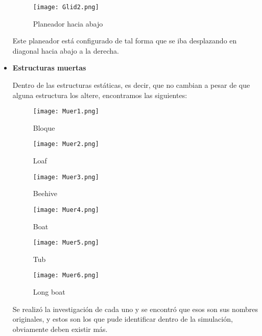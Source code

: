 \documentclass{article}
\begin{document}
\begin{itemize}
		\vspace{300pt}
		\begin{figure}[htbp]
		\centering       
		\texttt{[image: Glid2.png]}
		\caption{Planeador hacia abajo}
		\label{fig:G2} 
	\end{figure}
	
	Este planeador está configurado de tal forma que se iba desplazando en diagonal hacia abajo a la derecha. 
	
		\item \textbf{Estructuras muertas}
	
	Dentro de las estructuras estáticas, es decir, que no cambian a pesar de que alguna estructura los altere, encontramos las siguientes:
	\vspace{600pt}
	
	\begin{figure}[htbp]
		\centering       
		\texttt{[image: Muer1.png]}
		\caption{Bloque}
		\label{fig:muer1} 
	\end{figure}
	\vspace{100pt}
	\begin{figure}[htbp]
		\centering       
		\texttt{[image: Muer2.png]}
		\caption{Loaf}
		\label{fig:muer2} 
	\end{figure}
	\vspace{100pt}
	\begin{figure}[htbp]
		\centering       
		\texttt{[image: Muer3.png]}
		\caption{Beehive}
		\label{fig:muer3} 
	\end{figure}
\vspace{100pt}
	\begin{figure}[htbp]
		\centering       
		\texttt{[image: Muer4.png]}
		\caption{Boat}
		\label{fig:muer4} 
	\end{figure}
	\vspace{100pt}
	\begin{figure}[htbp]
		\centering       
		\texttt{[image: Muer5.png]}
		\caption{Tub}
		\label{fig:muer5} 
	\end{figure}
	\vspace{600pt}
	\begin{figure}[htbp]
		\centering       
		\texttt{[image: Muer6.png]}
		\caption{Long boat}
		\label{fig:muer6} 
	\end{figure}

	Se realizó la investigación de cada uno y se encontró que esos son sus nombres originales, y estos son los que pude identificar dentro de la simulación, obviamente deben existir más. \newpage	


\end{itemize}
\end{document}
